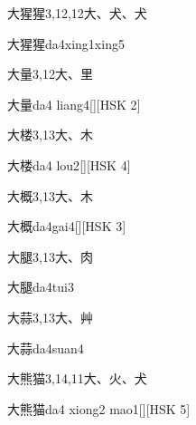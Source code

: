 \begin{entry}{大猩猩}{3,12,12}{⼤、⽝、⽝}
  \begin{phonetics}{大猩猩}{da4xing1xing5}
  \end{phonetics}
\end{entry}

\begin{entry}{大量}{3,12}{⼤、⾥}
  \begin{phonetics}{大量}{da4 liang4}[][HSK 2]
  \end{phonetics}
\end{entry}

\begin{entry}{大楼}{3,13}{⼤、⽊}
  \begin{phonetics}{大楼}{da4 lou2}[][HSK 4]
  \end{phonetics}
\end{entry}

\begin{entry}{大概}{3,13}{⼤、⽊}
  \begin{phonetics}{大概}{da4gai4}[][HSK 3]
  \end{phonetics}
\end{entry}

\begin{entry}{大腿}{3,13}{⼤、⾁}
  \begin{phonetics}{大腿}{da4tui3}
  \end{phonetics}
\end{entry}

\begin{entry}{大蒜}{3,13}{⼤、⾋}
  \begin{phonetics}{大蒜}{da4suan4}
  \end{phonetics}
\end{entry}

\begin{entry}{大熊猫}{3,14,11}{⼤、⽕、⽝}
  \begin{phonetics}{大熊猫}{da4 xiong2 mao1}[][HSK 5]
  \end{phonetics}
\end{entry}

